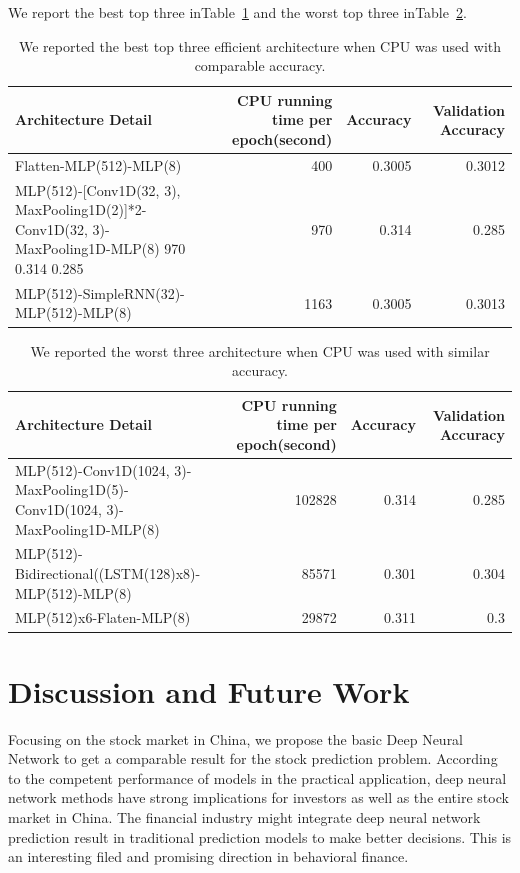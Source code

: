 \documentclass{article}
\begin{document}
We report the best top three inTable~\ref{tab:TopEfficientArch} and the worst top three inTable~\ref{tab:WorstEfficientArch}.
\begin{table}[htbp]
	\centering
	\begin{tabular}{p{20.75em}rrr}
		\toprule
		\textbf{Architecture Detail} & \multicolumn{1}{p{9.25em}}{\textbf{CPU running time per epoch(second)}} & \multicolumn{1}{p{4.065em}}{\textbf{Accuracy}} & \multicolumn{1}{p{6.315em}}{\textbf{Validation Accuracy}} \\
		\midrule
		Flatten-MLP(512)-MLP(8) & 400   & 0.3005 & 0.3012 \\
		MLP(512)-[Conv1D(32, 3), MaxPooling1D(2)]*2-Conv1D(32, 3)-MaxPooling1D-MLP(8) 970 0.314 0.285 & 970   & 0.314 & 0.285 \\
		MLP(512)-SimpleRNN(32)-MLP(512)-MLP(8) & 1163  & 0.3005 & 0.3013 \\
		\bottomrule
	\end{tabular}%
	\vspace{1em}
	\caption{We reported the best top three efficient architecture when CPU was used with comparable accuracy.  }\label{tab:TopEfficientArch} 
\end{table}

\begin{table}[htbp]
	\centering
	\begin{tabular}{p{20.75em}rrr}
		\toprule
		\textbf{Architecture Detail} & \multicolumn{1}{p{9.25em}}{\textbf{CPU running time per epoch(second)}} & \multicolumn{1}{p{4.065em}}{\textbf{Accuracy}} & \multicolumn{1}{p{6.315em}}{\textbf{Validation Accuracy}} \\
		\midrule
		MLP(512)-Conv1D(1024, 3)-MaxPooling1D(5)-Conv1D(1024, 3)-MaxPooling1D-MLP(8) & 102828 & 0.314 & 0.285 \\
		MLP(512)-Bidirectional((LSTM(128)x8)-MLP(512)-MLP(8) & 85571 & 0.301 & 0.304 \\
		MLP(512)x6-Flaten-MLP(8) & 29872 & 0.311 & 0.3 \\
		\bottomrule
	\end{tabular}%
	\vspace{1em}
	\caption{We reported the worst three architecture when CPU was used with similar accuracy.}\label{tab:WorstEfficientArch} 
\end{table}


\section{Discussion and Future Work}
\label{Discussion and Future Work}
Focusing on the stock market in China, we propose the basic Deep Neural Network to get a comparable result for the stock prediction problem. According to the competent performance of models in the practical application, deep neural network methods have strong implications for investors as well as the entire stock market in China. The financial industry might integrate deep neural network prediction result in traditional prediction models to make better decisions. This is an interesting filed and promising direction in behavioral finance.
\end{document}
